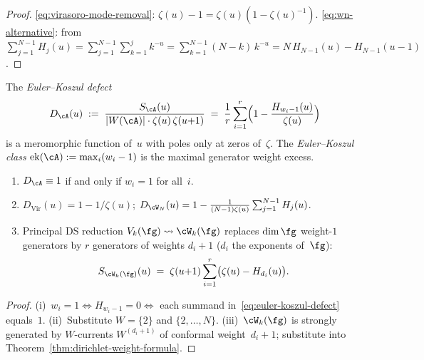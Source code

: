 \begin{proof}
\eqref{eq:virasoro-mode-removal}:
$\zeta(u) - 1 = \zeta(u)(1 - \zeta(u)^{-1})$.
\eqref{eq:wn-alternative}: from
$\sum_{j=1}^{N-1}H_j(u)
= \sum_{j=1}^{N-1}\sum_{k=1}^{j}k^{-u}
= \sum_{k=1}^{N-1}(N{-}k)\,k^{-u}
= N\,H_{N-1}(u) - H_{N-1}(u{-}1)$.
\end{proof}

\begin{definition}%
\label{def:euler-koszul-defect}%
\label{def:euler-koszul-class}%
%
%
The \emph{Euler--Koszul defect}
\begin{equation}\label{eq:euler-koszul-defect}
D_\cA(u)
\;:=\;
\frac{S_\cA(u)}{|W(\cA)|\cdot\zeta(u)\,\zeta(u{+}1)}
\;=\;
\frac{1}{r}\sum_{i=1}^r
\Bigl(1 - \frac{H_{w_i-1}(u)}{\zeta(u)}\Bigr)
\end{equation}
is a meromorphic function of~$u$ with poles only at zeros
of~$\zeta$.
The \emph{Euler--Koszul class}
$\operatorname{ek}(\cA) := \max_i(w_i - 1)$
is the maximal generator weight excess.
\end{definition}

\begin{theorem}[\ClaimStatusProvedHere]%
\label{thm:euler-koszul-criterion}%
\label{thm:euler-koszul-standard}%
%
\begin{enumerate}[label=\textup{(\roman*)}]
\item
$D_\cA \equiv 1$ if and only if $w_i = 1$ for all~$i$.
\item
$D_{\mathrm{Vir}}(u) = 1 - 1/\zeta(u)$; \quad
$D_{\cW_N}(u)
= 1 - \frac{1}{(N{-}1)\zeta(u)}
\sum_{j=1}^{N-1} H_j(u)$.
\item
Principal DS reduction $V_k(\fg) \leadsto \cW_k(\fg)$
replaces $\dim\fg$ weight-$1$ generators by $r$ generators
of weights $d_i + 1$ \textup{(}$d_i$ the exponents
of~$\fg$\textup{)}:
\begin{equation}\label{eq:ds-sewing-subtraction}
S_{\cW_k(\fg)}(u)
\;=\;
\zeta(u{+}1)\sum_{i=1}^{r}
\bigl(\zeta(u) - H_{d_i}(u)\bigr).
\end{equation}
\end{enumerate}
\end{theorem}

\begin{proof}
(i)~$w_i = 1 \Leftrightarrow H_{w_i-1} = 0
\Leftrightarrow$ each summand in~\eqref{eq:euler-koszul-defect}
equals~$1$.
(ii)~Substitute $W = \{2\}$ and $\{2,\ldots,N\}$.
(iii)~$\cW_k(\fg)$ is strongly generated by $W$-currents
$W^{(d_i+1)}$ of conformal weight~$d_i + 1$;
substitute into Theorem~\ref{thm:dirichlet-weight-formula}.
\end{proof}

